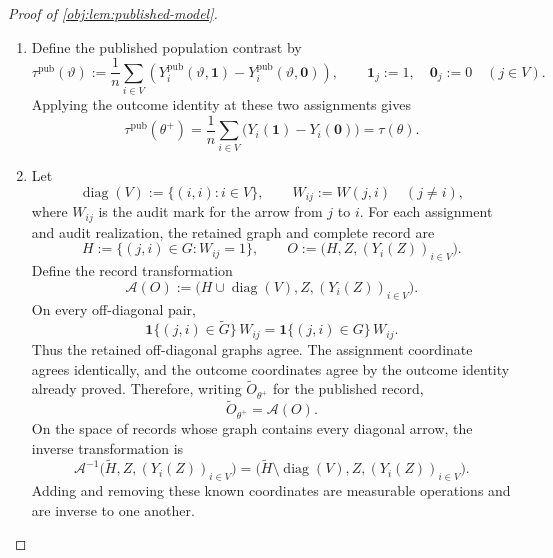\documentclass[11pt]{article}
\begin{document}
\begin{proof}[Proof of \cref{obj:lem:published-model}]
\begin{enumerate}
\item Define the published population contrast by
\[
\tau^{\mathrm{pub}}(\vartheta)
:=
\frac1n\sum_{i\in V}
\left(
Y_i^{\mathrm{pub}}(\vartheta,\mathbf1)
-Y_i^{\mathrm{pub}}(\vartheta,\mathbf0)
\right),
\qquad
\mathbf1_j:=1,\quad \mathbf0_j:=0
\quad(j\in V).
\]
Applying the outcome identity at these two assignments gives
\[
\tau^{\mathrm{pub}}(\theta^+)
=
\frac1n\sum_{i\in V}\bigl(Y_i(\mathbf1)-Y_i(\mathbf0)\bigr)
=\tau(\theta).
\]

\item Let
\[
\operatorname{diag}(V):=\{(i,i):i\in V\},
\qquad
W_{ij}:=W(j,i)\quad(j\ne i),
\]
where \(W_{ij}\) is the audit mark for the arrow from \(j\) to \(i\).
For each assignment and audit realization, the retained graph and complete record are
\[
H:=\{(j,i)\in G:W_{ij}=1\},
\qquad
O:=\bigl(H,Z,(Y_i(Z))_{i\in V}\bigr).
\]
Define the record transformation
\[
\mathcal A(O)
:=
\bigl(H\cup\operatorname{diag}(V),Z,(Y_i(Z))_{i\in V}\bigr).
\]
On every off-diagonal pair,
\[
\mathbf1\{(j,i)\in\widetilde G\}\,W_{ij}
=
\mathbf1\{(j,i)\in G\}\,W_{ij}.
\]
Thus the retained off-diagonal graphs agree. The assignment coordinate agrees identically, and the outcome coordinates agree by the outcome identity already proved. Therefore, writing \(\widetilde O_{\theta^+}\) for the published record,
\[
\widetilde O_{\theta^+}=\mathcal A(O).
\]
On the space of records whose graph contains every diagonal arrow, the inverse transformation is
\[
\mathcal A^{-1}
\bigl(\widetilde H,Z,(Y_i(Z))_{i\in V}\bigr)
=
\bigl(\widetilde H\setminus\operatorname{diag}(V),
Z,(Y_i(Z))_{i\in V}\bigr).
\]
Adding and removing these known coordinates are measurable operations and are inverse to one another.


\end{enumerate}
\end{proof}
\end{document}
